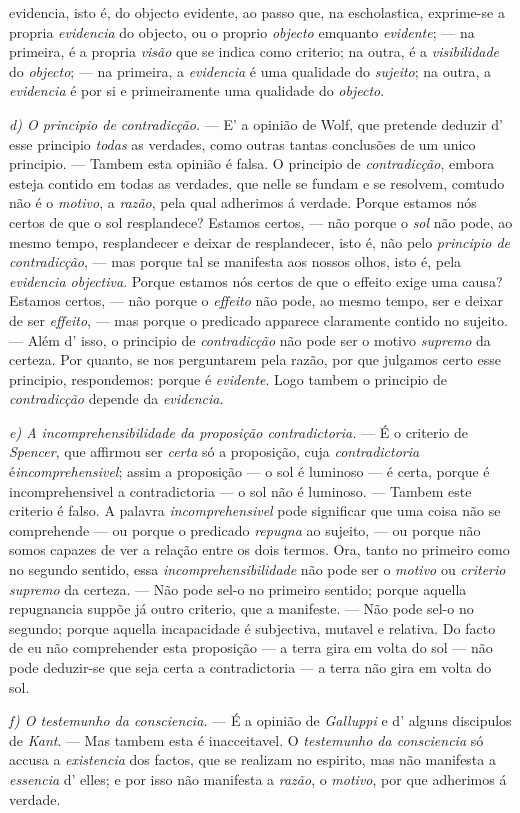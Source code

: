 evidencia, isto é, do objecto evidente, ao passo que, na escholastica, exprime-se a propria \emph{evidencia} do objecto, ou o proprio \emph{objecto} emquanto \emph{evidente}; --- na primeira, é a propria \emph{visão} que se indica como criterio; na outra, é a \emph{visibilidade} do \emph{objecto}; --- na primeira, a \emph{evidencia} é uma qualidade do \emph{sujeito}; na outra, a \emph{evidencia} é por si e primeiramente uma qualidade do \emph{objecto}.\par \emph{d) O principio de contradicção.} --- E' a opinião de Wolf, que pretende deduzir d' esse principio \emph{todas} as verdades, como outras tantas conclusões de um unico principio. --- Tambem esta opinião é falsa. O principio de \emph{contradicção}, embora esteja contido em todas as verdades, que nelle se fundam e se resolvem, comtudo não é o \emph{motivo}, a \emph{razão}, pela qual adherimos á verdade. Porque estamos nós certos de que o sol resplandece? Estamos certos, --- não porque o \emph{sol} não pode, ao mesmo tempo, resplandecer e deixar de resplandecer, isto é, não pelo \emph{principio de contradicção}, --- mas porque tal se manifesta aos nossos olhos, isto é, pela \emph{evidencia objectiva}. Porque estamos nós certos de que o effeito exige uma causa? Estamos certos, --- não porque o \emph{effeito} não pode, ao mesmo tempo, ser e deixar de ser \emph{effeito}, --- mas porque o predicado apparece claramente contido no sujeito. --- Além d' isso, o principio de \emph{contradicção} não pode ser o motivo \emph{supremo} da certeza. Por quanto, se nos perguntarem pela razão, por que julgamos certo esse principio, respondemos: porque é \emph{evidente}. Logo tambem o principio de \emph{contradicção} depende da \emph{evidencia}.\par \emph{e) A incomprehensibilidade da proposição contradictoria.} --- É o criterio de \emph{Spencer}, que affirmou ser \emph{certa} só a proposição, cuja \emph{contradictoria} é\emph{incomprehensivel}; assim a proposição --- o sol é luminoso --- é certa, porque é incomprehensivel a contradictoria --- o sol não é luminoso. --- Tambem este criterio é falso. A palavra \emph{incomprehensivel} pode significar que uma coisa não se comprehende --- ou porque o predicado \emph{repugna} ao sujeito, --- ou porque não somos capazes de ver a relação entre os dois termos. Ora, tanto no primeiro como no segundo sentido, essa \emph{incomprehensibilidade} não pode ser o \emph{motivo} ou \emph{criterio supremo} da certeza. --- Não pode sel-o no primeiro sentido; porque aquella repugnancia suppõe já outro criterio, que a manifeste. --- Não pode sel-o no segundo; porque aquella incapacidade é subjectiva, mutavel e relativa. Do facto de eu não comprehender esta proposição --- a terra gira em volta do sol --- não pode deduzir-se que seja certa a contradictoria --- a terra não gira em volta do sol.\par \emph{f) O testemunho da consciencia.} --- É a opinião de \emph{Galluppi} e d' alguns discipulos de \emph{Kant}. --- Mas tambem esta é inacceitavel. O \emph{testemunho da consciencia} só accusa a \emph{existencia} dos factos, que se realizam no espirito, mas não manifesta a \emph{essencia} d' elles; e por isso não manifesta a \emph{razão}, o \emph{motivo}, por que adherimos á verdade. 